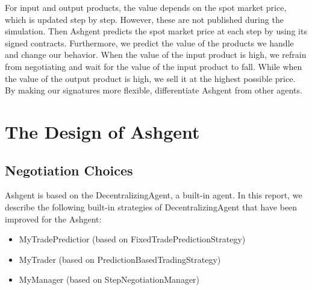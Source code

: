 \documentclass[10pt]{article}
\begin{document}
For input and output products, the value depends on the spot market price, which is updated step by step.
However, these are not published during the simulation.
Then Ashgent predicts the spot market price at each step by using its signed contracts.
Furthermore, we predict the value of the products we handle and change our behavior.
When the value of the input product is high, we refrain from negotiating and wait for the value of the input product to fall.
While when the value of the output product is high, we sell it at the highest possible price.
By making our signatures more flexible, differentiate Ashgent from other agents.


\section{The Design of Ashgent}
\subsection{Negotiation Choices}
Ashgent is based on the DecentralizingAgent, a built-in agent.
In this report, we describe the following built-in strategies of DecentralizingAgent that have been improved for the Ashgent:
\begin{itemize}
    \item MyTradePredictior (based on FixedTradePredictionStrategy) %
    \item MyTrader (based on PredictionBasedTradingStrategy)%
    \item MyManager (based on StepNegotiationManager) %
\end{itemize}
\end{document}

